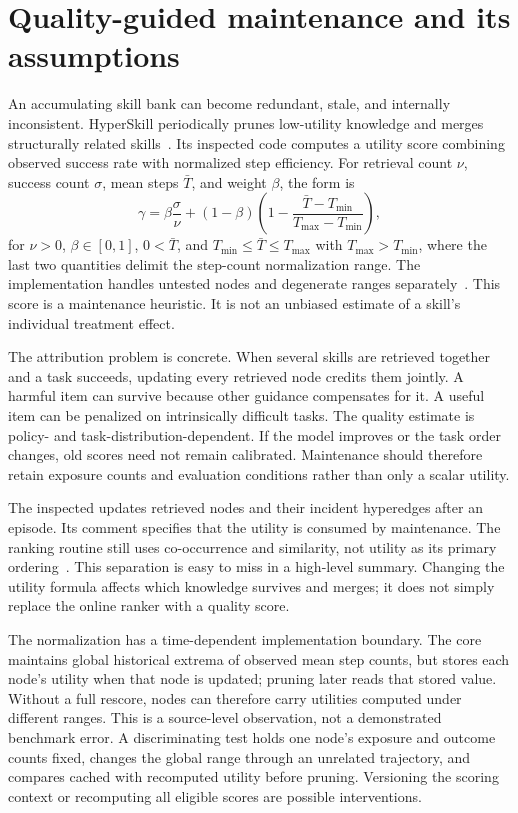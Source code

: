 \section{Quality-guided maintenance and its assumptions}\label{sec:C15:maintenance}
An accumulating skill bank can become redundant, stale, and internally inconsistent. HyperSkill periodically prunes low-utility knowledge and merges structurally related skills~\cite{xu2026hyperskill}. Its inspected code computes a utility score combining observed success rate with normalized step efficiency. For retrieval count $\nu$, success count $\sigma$, mean steps $\bar T$, and weight $\beta$, the form is
\begin{equation}
 \gamma=\beta\frac{\sigma}{\nu}
 +(1-\beta)\left(1-\frac{\bar T-T_{\min}}{T_{\max}-T_{\min}}\right),
\end{equation}
for $\nu>0$, $\beta\in[0,1]$, $0<\bar T$, and $T_{\min}\leq\bar T\leq T_{\max}$ with $T_{\max}>T_{\min}$, where the last two quantities delimit the step-count normalization range. The implementation handles untested nodes and degenerate ranges separately~\cite{repo_hyperskill2026}. This score is a maintenance heuristic. It is not an unbiased estimate of a skill's individual treatment effect.

The attribution problem is concrete. When several skills are retrieved together and a task succeeds, updating every retrieved node credits them jointly. A harmful item can survive because other guidance compensates for it. A useful item can be penalized on intrinsically difficult tasks. The quality estimate is policy- and task-distribution-dependent. If the model improves or the task order changes, old scores need not remain calibrated. Maintenance should therefore retain exposure counts and evaluation conditions rather than only a scalar utility.

The inspected  updates retrieved nodes and their incident hyperedges after an episode. Its comment specifies that the utility is consumed by maintenance. The ranking routine still uses co-occurrence and similarity, not utility as its primary ordering~\cite{repo_hyperskill2026}. This separation is easy to miss in a high-level summary. Changing the utility formula affects which knowledge survives and merges; it does not simply replace the online ranker with a quality score.

The normalization has a time-dependent implementation boundary. The core maintains global historical extrema of observed mean step counts, but stores each node's utility when that node is updated; pruning later reads that stored value. Without a full rescore, nodes can therefore carry utilities computed under different ranges. This is a source-level observation, not a demonstrated benchmark error. A discriminating test holds one node's exposure and outcome counts fixed, changes the global range through an unrelated trajectory, and compares cached with recomputed utility before pruning. Versioning the scoring context or recomputing all eligible scores are possible interventions.

